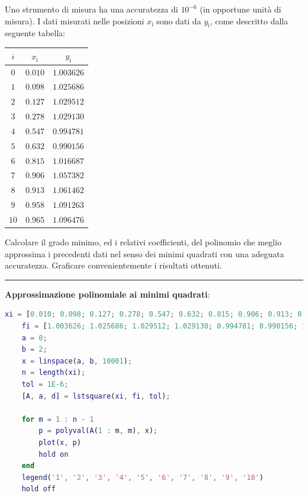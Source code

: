 Uno strumento di misura ha una accuratezza di $10^{-6}$ (in opportune unità di misura). I dati misurati nelle posizioni $x_\mathrm{i}$ sono dati da $y_\mathrm{i}$, come descritto
dalla seguente tabella:
\begin{table}[H]
	\centering
	\begin{tabular}{|c|c|c|}
		\hline
		$i$ & $x_\mathrm{i}$ & $y_\mathrm{i}$ \\
		\hline
		$0$ & $0.010$ & $1.003626$ \\
		$1$ & $0.098$ & $1.025686$ \\
		$2$ & $0.127$ & $1.029512$ \\
		$3$ & $0.278$ & $1.029130$ \\
		$4$ & $0.547$ & $0.994781$ \\
		$5$ & $0.632$ & $0.990156$ \\
		$6$ & $0.815$ & $1.016687$ \\
		$7$ & $0.906$ & $1.057382$ \\
		$8$ & $0.913$ & $1.061462$ \\
		$9$ & $0.958$ & $1.091263$ \\
		$10$ & $0.965$ & $1.096476$ \\
		\hline
	\end{tabular}
\end{table}
Calcolare il grado minimo, ed i relativi coefficienti, del polinomio che meglio approssima i precedenti dati nel senso dei minimi quadrati con una adeguata accuratezza.
Graficare convenientemente i risultati ottenuti.

\hspace*{\fill}
\par\noindent\rule{\textwidth}{0.4pt}
\hspace*{\fill}

\textbf{Approssimazione polinomiale ai minimi quadrati}:

\begin{minipage}{\textwidth}
	\begin{lstlisting}[language=Matlab, caption=Codice Matlab]
	xi = [0.010; 0.098; 0.127; 0.278; 0.547; 0.632; 0.815; 0.906; 0.913; 0.958; 0.965];
	fi = [1.003626; 1.025686; 1.029512; 1.029130; 0.994781; 0.990156; 1.016687; 1.057382; 1.061462; 1.091263; 1.096476];
	a = 0;
	b = 2;
	x = linspace(a, b, 10001);
	n = length(xi);
	tol = 1E-6;
	[A, a, d] = lstsquare(xi, fi, tol);

	for m = 1 : n - 1
		p = polyval(A(1 : m, m), x);
		plot(x, p)
		hold on
	end
	legend('1', '2', '3', '4', '5', '6', '7', '8', '9', '10')
	hold off
	\end{lstlisting}
\end{minipage}

